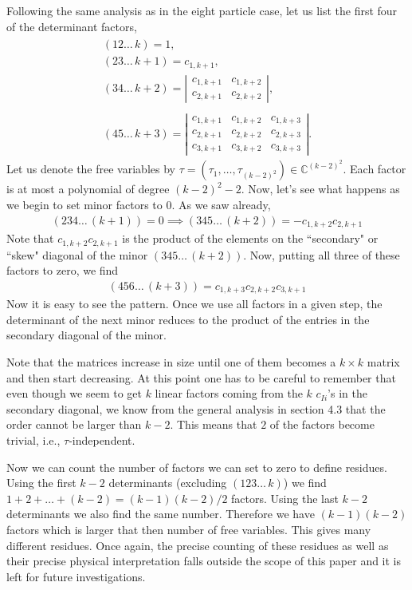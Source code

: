 \documentclass[12pt]{article}
\newcommand{\be}{\begin{eqnarray}}
\newcommand{\ee}{\end{eqnarray}}
\begin{document}
Following the same analysis as in the eight particle case, let us list the first four of the determinant factors,
%
\be
\begin{array}{l}
(12\ldots \, k) = 1, \\
(23\ldots \, k+1) = c_{1,k+1}, \\
(34\ldots \,  k+2) = \left| \begin{array}{cc} c_{1,k+1} & c_{1,k+2} \\ c_{2,k+1} & c_{2,k+2} \end{array} \right|, \\ \\
(45\ldots \, k+3) = \left| \begin{array}{ccc} c_{1,k+1} & c_{1,k+2} & c_{1,k+3} \\ c_{2,k+1} & c_{2,k+2} & c_{2,k+3} \\ c_{3,k+1} & c_{3,k+2} & c_{3,k+3} \end{array} \right|.
\end{array}
\ee
%
Let us denote the free variables by $\tau=(\tau_1,\ldots, \tau_{(k-2)^2})\in \mathbb{C}^{(k-2)^2}$. Each factor is at most a polynomial of degree $(k-2)^2-2$.
Now, let's see what happens as we begin to set minor factors to 0. As we saw already,
\be
(234 \ldots\, (k+1)) = 0 \implies (345\ldots \, (k+2)) =  - c_{1,k+2} c_{2,k+1}
\ee
Note that $c_{1,k+2} c_{2,k+1}$ is the product of the elements on the ``secondary" or ``skew" diagonal of the minor $(345\ldots \, (k+2))$. Now, putting all three of these factors to zero, we find
\be
(456 \ldots \, (k+3)) = c_{1,k+3} c_{2,k+2} c_{3,k+1}
\ee
Now it is easy to see the pattern. Once we use all factors in a given step, the determinant of the next minor reduces to the product of the entries in the secondary diagonal of the minor.

Note that the matrices increase in size until one of them becomes a $k\times k$ matrix and then start decreasing. At this point one has to be careful to remember that even though we seem to get $k$ linear factors coming from the $k$ $c_{Ii}$'s in the secondary diagonal, we know from the general analysis in section 4.3 that the order cannot be larger than $k-2$. This means that $2$ of the factors become trivial, i.e., $\tau$-independent.

Now we can count the number of factors we can set to zero to define residues. Using the first $k-2$ determinants (excluding $(123\ldots\, k)$) we find $1+2+\ldots +(k-2) = (k-1)(k-2)/2$ factors. Using the last $k-2$ determinants we also find the same number. Therefore we have $(k-1)(k-2)$ factors which is larger that then number of free variables. This gives many different residues.
Once again, the precise counting of these residues as well as their precise physical interpretation falls outside the scope of this paper and it is left for future investigations.
\end{document}
